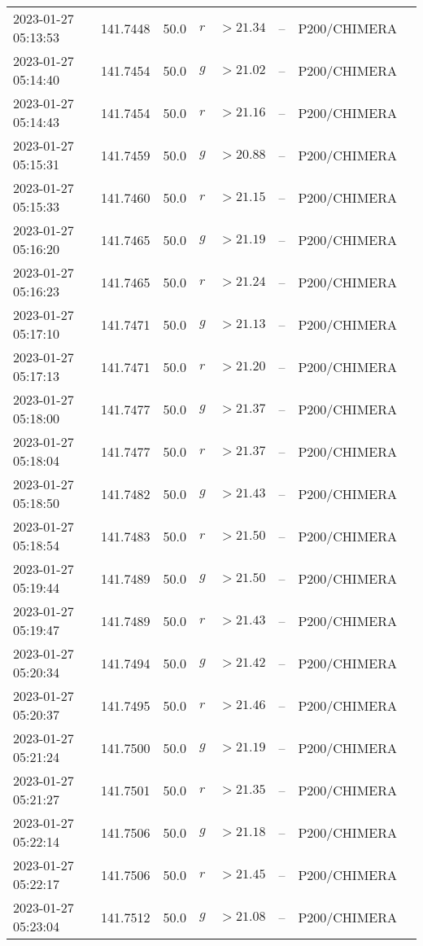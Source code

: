 \documentclass{nature_plusfigure}
\begin{document}
\begin{supplement}
\begin{center}
\begin{longtable}{llllllll}
2023-01-27 05:13:53 & 141.7448 & 50.0 & $r$ & $>21.34$ & -- & P200/CHIMERA &  \\ 
2023-01-27 05:14:40 & 141.7454 & 50.0 & $g$ & $>21.02$ & -- & P200/CHIMERA &  \\ 
2023-01-27 05:14:43 & 141.7454 & 50.0 & $r$ & $>21.16$ & -- & P200/CHIMERA &  \\ 
2023-01-27 05:15:31 & 141.7459 & 50.0 & $g$ & $>20.88$ & -- & P200/CHIMERA &  \\ 
2023-01-27 05:15:33 & 141.7460 & 50.0 & $r$ & $>21.15$ & -- & P200/CHIMERA &  \\ 
2023-01-27 05:16:20 & 141.7465 & 50.0 & $g$ & $>21.19$ & -- & P200/CHIMERA &  \\ 
2023-01-27 05:16:23 & 141.7465 & 50.0 & $r$ & $>21.24$ & -- & P200/CHIMERA &  \\ 
2023-01-27 05:17:10 & 141.7471 & 50.0 & $g$ & $>21.13$ & -- & P200/CHIMERA &  \\ 
2023-01-27 05:17:13 & 141.7471 & 50.0 & $r$ & $>21.20$ & -- & P200/CHIMERA &  \\ 
2023-01-27 05:18:00 & 141.7477 & 50.0 & $g$ & $>21.37$ & -- & P200/CHIMERA &  \\ 
2023-01-27 05:18:04 & 141.7477 & 50.0 & $r$ & $>21.37$ & -- & P200/CHIMERA &  \\ 
2023-01-27 05:18:50 & 141.7482 & 50.0 & $g$ & $>21.43$ & -- & P200/CHIMERA &  \\ 
2023-01-27 05:18:54 & 141.7483 & 50.0 & $r$ & $>21.50$ & -- & P200/CHIMERA &  \\ 
2023-01-27 05:19:44 & 141.7489 & 50.0 & $g$ & $>21.50$ & -- & P200/CHIMERA &  \\ 
2023-01-27 05:19:47 & 141.7489 & 50.0 & $r$ & $>21.43$ & -- & P200/CHIMERA &  \\ 
2023-01-27 05:20:34 & 141.7494 & 50.0 & $g$ & $>21.42$ & -- & P200/CHIMERA &  \\ 
2023-01-27 05:20:37 & 141.7495 & 50.0 & $r$ & $>21.46$ & -- & P200/CHIMERA &  \\ 
2023-01-27 05:21:24 & 141.7500 & 50.0 & $g$ & $>21.19$ & -- & P200/CHIMERA &  \\ 
2023-01-27 05:21:27 & 141.7501 & 50.0 & $r$ & $>21.35$ & -- & P200/CHIMERA &  \\ 
2023-01-27 05:22:14 & 141.7506 & 50.0 & $g$ & $>21.18$ & -- & P200/CHIMERA &  \\ 
2023-01-27 05:22:17 & 141.7506 & 50.0 & $r$ & $>21.45$ & -- & P200/CHIMERA &  \\ 
2023-01-27 05:23:04 & 141.7512 & 50.0 & $g$ & $>21.08$ & -- & P200/CHIMERA &  \\ 

\end{longtable}
\end{center}
\end{supplement}
\end{document}
